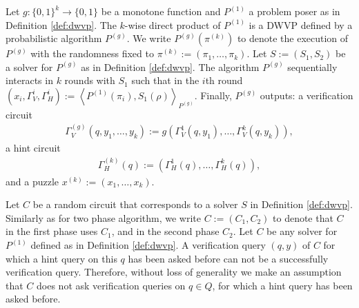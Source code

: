 \begin{definition}
Let $g: \{0,1\}^{k} \rightarrow \{0,1\}$ be a monotone function and $P^{(1)}$ a problem poser as in Definition \ref{def:dwvp}.
The $k$-wise direct product of $P^{(1)}$ is a DWVP defined by a probabilistic algorithm $P^{(g)}$.
We write $P^{(g)}(\pi^{(k)})$ to denote the execution of $P^{(g)}$ with the randomness fixed to $\pi^{(k)} := (\pi_1, \dots, \pi_k)$.
Let $S := (S_1, S_2)$ be a solver for $P^{(g)}$ as in Definition \ref{def:dwvp}.
The algorithm $P^{(g)}$ sequentially interacts in $k$ rounds with $S_1$ such that
in the $i$th round $(x_i, \Gamma_V^{i}, \Gamma_H^{i} ) := \left\langle P^{(1)}(\pi_i), S_1(\rho) \right\rangle_{P^{(g)}}$.
Finally, $P^{(g)}$ outputs:
a verification circuit
\begin{align*}
  \Gamma_V^{(g)} (q, y_1, \dots, y_k) := g(\Gamma_V^{1}(q, y_1), \dots, \Gamma_V^{k}(q, y_k)),
\end{align*}
a hint circuit
\begin{align*}
  \Gamma_H^{(k)} (q) := (\Gamma_H^{1}(q), \dots, \Gamma_H^{k}(q)),
\end{align*}
and a puzzle $x^{(k)} := (x_1, \dots, x_k)$.

\end{definition}
%
Let $C$ be a random circuit that corresponds to a solver $S$ in Definition \ref{def:dwvp}.
Similarly as for two phase algorithm, we write $C := (C_1, C_2)$ to denote that $C$ in the first phase uses $C_1$,
and in the second phase $C_2$.
%
Let $C$ be any solver for $P^{(1)}$ defined as in Definition \ref{def:dwvp}.
A verification query $(q,y)$ of $C$ for which a hint query on this $q$ has been asked before can not be a successfully verification query.
Therefore, without loss of generality we make an assumption that $C$ does not ask verification queries on $q \in Q$,
for which a hint query has been asked before.

